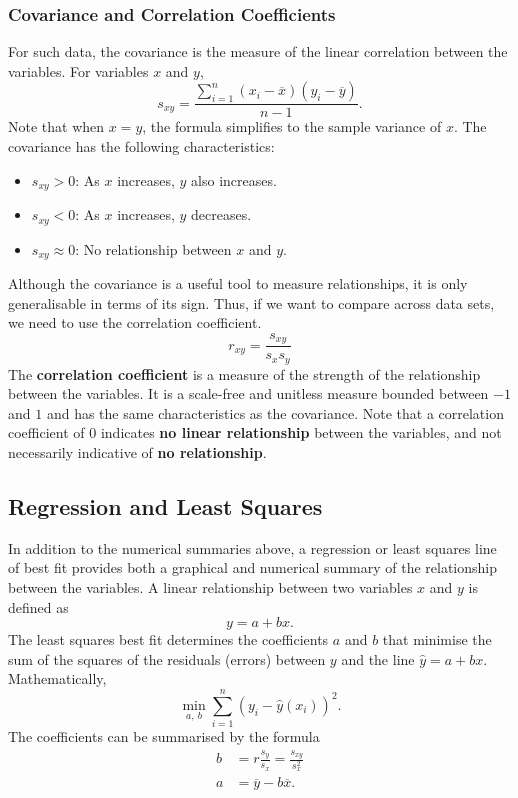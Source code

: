 \documentclass{article}
\begin{document}
\subsubsection{Covariance and Correlation Coefficients}
For such data, the covariance is the measure of the linear correlation
between the variables. For variables \(x\) and \(y\),
\begin{equation*}
    s_{xy} = \frac{\sum_{i = 1}^n \left( x_i - \overline{x} \right) \left( y_i - \overline{y} \right)}{n - 1}.
\end{equation*}
Note that when \(x = y\), the formula simplifies to the sample variance of \(x\).
The covariance has the following characteristics:
\begin{itemize}
    \item \(s_{xy} > 0\): As \(x\) increases, \(y\) also increases.
    \item \(s_{xy} < 0\): As \(x\) increases, \(y\) decreases.
    \item \(s_{xy} \approx 0\): No relationship between \(x\) and \(y\).
\end{itemize}
Although the covariance is a useful tool to measure relationships, it is
only generalisable in terms of its sign. Thus, if we want to compare across
data sets, we need to use the correlation coefficient.
\begin{equation*}
    r_{xy} = \frac{s_{xy}}{s_x s_y}
\end{equation*}
The \textbf{correlation coefficient} is a measure of the strength of the
relationship between the variables. It is a scale-free and unitless
measure bounded between \(-1\) and \(1\) and has the same
characteristics as the covariance. Note that a correlation coefficient
of \(0\) indicates \textbf{no linear relationship} between the
variables, and not necessarily indicative of \textbf{no relationship}.
\subsection{Regression and Least Squares}
In addition to the numerical summaries above, a regression or least
squares line of best fit provides both a graphical and numerical
summary of the relationship between the variables. A linear
relationship between two variables \(x\) and \(y\) is defined as
\begin{equation*}
    y = a + b x.
\end{equation*}
The least squares best fit determines the coefficients \(a\) and \(b\)
that minimise the sum of the squares of the residuals (errors) between
\(y\) and the line \(\hat{y} = a + b x\). Mathematically,
\begin{equation*}
    \min_{a,\: b} \sum_{i = 1}^n \left( y_i - \hat{y}\left( x_i \right) \right)^2.
\end{equation*}
The coefficients can be summarised by the formula
\begin{align*}
    b & = r \frac{s_y}{s_x} = \frac{s_{xy}}{s_x^2} \\
    a & = \overline{y} - b \overline{x}.
\end{align*}
\end{document}
